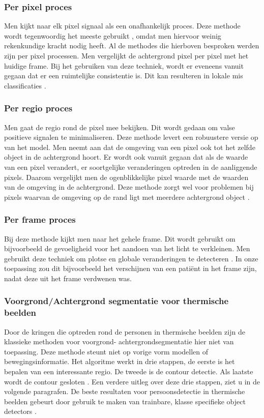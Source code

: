 \subsubsection{Per pixel proces}
\label{refPPP}
Men kijkt naar elk pixel signaal als een onafhankelijk proces. Deze methode wordt tegenwoordig het meeste gebruikt \cite{bibBET8}, omdat men hiervoor weinig rekenkundige kracht nodig heeft. Al de methodes die hierboven besproken werden zijn per pixel processen. Men vergelijkt de achtergrond pixel per pixel met het huidige frame. Bij het gebruiken van deze techniek, wordt er eveneens vanuit gegaan dat er een ruimtelijke consistentie is. Dit kan resulteren in lokale mis classificaties \cite{bibBET8}.

\subsubsection{Per regio proces}
\label{refPRP}
Men gaat de regio rond de pixel mee bekijken. Dit wordt gedaan om valse positieve signalen te minimaliseren. Deze methode levert een robuustere versie op van het model. Men neemt aan dat de omgeving van een pixel ook tot het zelfde object in de achtergrond hoort. Er wordt ook vanuit gegaan dat als de waarde van een pixel verandert, er soortgelijke veranderingen optreden in de aanliggende pixels. Daarom vergelijkt men de ogenblikkelijke pixel waarde met de waarden van de omgeving in de achtergrond. Deze methode zorgt wel voor problemen bij pixels waarvan de omgeving op de rand ligt met meerdere achtergrond object  \cite{bibBET8}.

\subsubsection{Per frame proces}
\label{refPFP}
Bij deze methode kijkt men naar het gehele frame. Dit wordt gebruikt om bijvoorbeeld de gevoeligheid voor het aandoen van het licht te verkleinen. Men gebruikt deze techniek om plotse en globale veranderingen te detecteren \cite{bibBET8}. In onze toepassing zou dit bijvoorbeeld het verschijnen van een pati\"ent in het frame zijn, nadat deze uit het frame verdwenen was.

\subsubsection{Voorgrond/Achtergrond segmentatie voor thermische beelden}
\label{refBETB}
Door de kringen die optreden rond de personen in thermische beelden zijn de klassieke methoden voor voorgrond- achtergrondsegmentatie hier niet van toepassing. Deze methode steunt niet op vorige vorm modellen of bewegingsinformatie. Het algoritme werkt in drie stappen, de eerste is het bepalen van een interessante regio. De tweede is de contour detectie. Als laatste wordt de contour gesloten \cite{bibBET5}. Een verdere uitleg over deze drie stappen, ziet u in de volgende paragrafen. De beste resultaten voor persoonsdetectie in thermische beelden gebeurt door gebruik te maken van trainbare, klasse specifieke object detectors \cite{bibBET7}.

